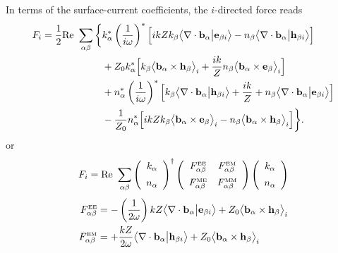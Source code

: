 In terms of the surface-current coefficients, the $i$-directed force reads 
\begin{align*}
 F_i
= \frac{1}{2}\text{Re }\sum_{\alpha\beta}
 \bigg\{&
   k^*_\alpha\left(\frac{1}{i\omega}\right)^*
    \Big[ ikZ k_\beta \big\langle \nabla \cdot \mathbf{b}_\alpha \big| \mathbf{e}_{\beta i} \big\rangle
             -n_\beta  \big\langle \nabla \cdot \mathbf{b}_\alpha \big| \mathbf{h}_{\beta i} \big\rangle
    \Big]
\\
&+ Z_0 k^*_\alpha
    \Big[ k_\beta \big\langle \mathbf{b}_\alpha \times \mathbf{h}_\beta\big\rangle_i
         +\frac{ik}{Z} n_\beta \big\langle \mathbf{b}_\alpha \times \mathbf{e}_\beta\big\rangle_i
    \Big]
\\
&+
   n^*_\alpha\left(\frac{1}{i\omega}\right)^*
    \Big[ k_\beta \big\langle \nabla \cdot \mathbf{b}_\alpha \big| \mathbf{h}_{\beta i} \big\rangle
         +\frac{ik}{Z} +n_\beta \big\langle \nabla \cdot \mathbf{b}_\alpha \big| \mathbf{e}_{\beta i} \big\rangle
    \Big]
\\
&- \frac{1}{Z_0} n^*_\alpha
    \Big[ ikZ k_\beta \big\langle \mathbf{b}_\alpha \times \mathbf{e}_\beta\big\rangle_i
          -n_\beta \big\langle \mathbf{b}_\alpha \times \mathbf{h}_\beta\big\rangle_i
    \Big] \bigg\}.
\end{align*}
or 
$$
 F_i
  = \text{Re }\sum_{\alpha\beta}
    \left(
     \begin{array}{c}
      k_\alpha \\[5pt]
      n_\alpha
     \end{array}
    \right) ^\dagger
    \left(\begin{array}{cc}
     F^{\hbox{\tiny{EE}}}_{\alpha\beta} & 
     F^{\hbox{\tiny{EM}}}_{\alpha\beta} \\[5pt]
     F^{\hbox{\tiny{ME}}}_{\alpha\beta} &
     F^{\hbox{\tiny{MM}}}_{\alpha\beta}
     \end{array}
    \right)
    \left(
     \begin{array}{c}
      k_\alpha \\[5pt]
      n_\alpha
     \end{array}
    \right)
$$
\begin{align*}
 F^{\hbox{\tiny{EE}}}_{\alpha\beta}
 &=
 -\left(\frac{1}{2\omega}\right)
  kZ \big\langle \nabla \cdot \mathbf{b}_\alpha \big| \mathbf{e}_{\beta i} \big\rangle
               +Z_0  \big\langle \mathbf{b}_\alpha \times \mathbf{h}_\beta\big\rangle_i 
\\
 F^{\hbox{\tiny{EM}}}_{\alpha\beta}
 &=
 +\frac{kZ}{2\omega} \big\langle \nabla \cdot \mathbf{b}_\alpha \big| \mathbf{h}_{\beta i} \big\rangle
               +Z_0  \big\langle \mathbf{b}_\alpha \times \mathbf{h}_\beta\big\rangle_i 
\\
\end{align*}

